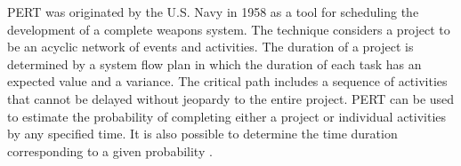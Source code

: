 PERT was originated by the U.S. Navy in 1958 as a tool for scheduling the development of a complete weapons system. The technique considers a project to be an acyclic network of events and activities. The duration of a project is determined by a system flow plan in which the duration of each task has an expected value and a variance. The critical path includes a sequence of activities that cannot be delayed without jeopardy to the entire project. PERT can be used to estimate the probability of completing either a project or individual activities by any specified time. It is also possible to determine the time duration corresponding to a given probability \cite{cottrell1999simplified}.

